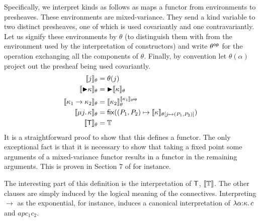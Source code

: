 Specifically, we interpret kinds as follows as maps a functor from
environments to presheaves. These environments are mixed-variance.
They send a kind variable to two distinct presheaves, one of which is
used covariantly and one contravariantly. Let us signify these
environments by $\theta$ (to distinguish them with from the
environment used by the interpretation of constructors) and write
$\theta^{\mathsf{op}}$ for the operation exchanging all the components of
$\theta$. Finally, by convention let $\theta(\alpha)$ project out the
presheaf being used covariantly.
\begin{align*}
  \llbracket j \rrbracket_\theta &= \theta(j)\\
  \llbracket {\blacktriangleright} \kappa \rrbracket_\theta &= {\blacktriangleright} \llbracket \kappa \rrbracket_\theta\\
  \llbracket \kappa_1 \to \kappa_2 \rrbracket_\theta &= \llbracket \kappa_2 \rrbracket_\theta^{\llbracket \kappa_1 \rrbracket_{\theta^{\mathsf{op}}}}\\
  \llbracket \mu j.\, \kappa \rrbracket_\theta &= \mathsf{fix}((P_1, P_2) \mapsto \llbracket \kappa \rrbracket_{\theta[j \mapsto (P_1, P_2)]})\\
  \llbracket \mathsf{T} \rrbracket_\theta &= \mathbb{T}\\
\end{align*}
It is a straightforward proof to show that this defines a functor. The
only exceptional fact is that it is necessary to show that taking a
fixed point some arguments of a mixed-variance functor results in a
functor in the remaining arguments. This is proven in Section 7 of
\citet{Birkedal:steps:11} for instance.

The interesting part of this definition is the interpretation of
$\mathsf{T}$, $\llbracket \mathbb{T} \rrbracket$. The other clauses are simply induced by the
logical meaning of the connectives. Interpreting $\to$ as the
exponential, for instance, induces a canonical interpretation of
$\lambda \alpha {:} \kappa.\, c$ and $ap{c_1}{c_2}$.

